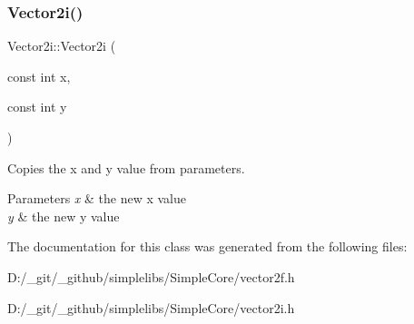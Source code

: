 \subsubsection{\texorpdfstring{Vector2i()}{Vector2i()}\hspace{0.1cm}{\footnotesize\ttfamily [4/4]}}
{\footnotesize\ttfamily Vector2i\+::\+Vector2i (\begin{DoxyParamCaption}\item[{const int}]{x,  }\item[{const int}]{y }\end{DoxyParamCaption})\hspace{0.3cm}{\ttfamily [inline]}}



Copies the x and y value from parameters. 


\begin{DoxyParams}{Parameters}
{\em x} & the new x value \\
\hline
{\em y} & the new y value \\
\hline
\end{DoxyParams}


The documentation for this class was generated from the following files\+:\begin{DoxyCompactItemize}
\item 
D\+:/\+\_\+git/\+\_\+github/simplelibs/\+Simple\+Core/vector2f.\+h\item 
D\+:/\+\_\+git/\+\_\+github/simplelibs/\+Simple\+Core/vector2i.\+h\end{DoxyCompactItemize}
